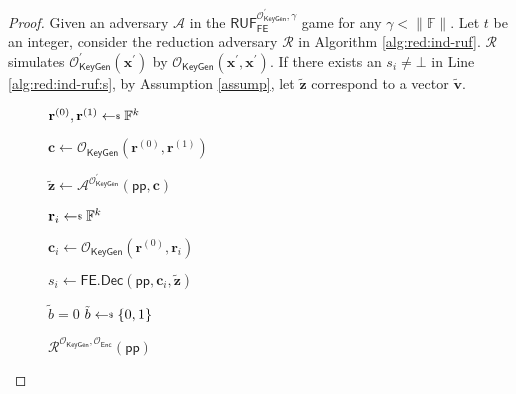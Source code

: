 \begin{proof}
Given an adversary $\mathcal{A}$ in the $\textsf{RUF}^{\mathcal{O}^\prime_{\textsf{KeyGen}}, \gamma}_{\textsf{FE}}$ game for any $\gamma < \|\mathbb{F}\|$. Let $t$ be an integer, consider the reduction adversary $\mathcal{R}$ in Algorithm \ref{alg:red:ind-ruf}. $\mathcal{R}$ simulates $\mathcal{O}_\textsf{KeyGen}^\prime(\mathbf{x}^\prime)$ by $\mathcal{O}_\textsf{KeyGen}(\mathbf{x}^\prime, \mathbf{x}^\prime)$.
If there exists an $s_i \neq \bot$ in Line \ref{alg:red:ind-ruf:s}, by Assumption \ref{assump}, let $\mathbf{\tilde{z}}$ correspond to a vector $\mathbf{\tilde{v}}$.

\begin{figure}[h]
\centering
	
	\begin{minipage}[t]{0.5\linewidth}
	\centering
	\begin{algorithm}[H]
	\caption{$\mathcal{R}^{\mathcal{O}_{\textsf{KeyGen}}, \mathcal{O}_{\textsf{Enc}}}(\textsf{pp})$}
	\label{alg:red:ind-ruf}
	\begin{algorithmic}[1]
		\State $\mathbf{r}^{(0)}, \mathbf{r}^{(1)} \getsdollar \mathbb{F}^{k}$
		
		\State $\mathbf{c} \gets \mathcal{O}_{\textsf{KeyGen}}(\mathbf{r}^{(0)}, \mathbf{r}^{(1)})$ 

		\State ${\mathbf{\tilde{z}}} \gets {\mathcal{A}}^{\mathcal{O}^\prime_{\textsf{KeyGen}}} (\textsf{pp}, \mathbf{c})$

		
			\State $\mathbf{r}_i \getsdollar \mathbb{F}^{k}$

			\State $\mathbf{c}_i \gets \mathcal{O}_{\textsf{KeyGen}}(\mathbf{r}^{(0)}, \mathbf{r}_i)$

			\State $s_i \gets \textsf{FE.Dec}( \textsf{pp}, \mathbf{c}_i, \mathbf{\tilde{z}} )$ \label{alg:red:ind-ruf:s}
	
		\EndFor	
		
		 \label{alg:red:ind-ruf:verify}
			\State \Return $\tilde{b} = 0$
		\Else
			\State \Return $\tilde{b} \getsdollar \{0, 1\}$
		\EndIf

	\end{algorithmic}
	\end{algorithm}
	\end{minipage}
	
\end{figure}



\end{proof}
